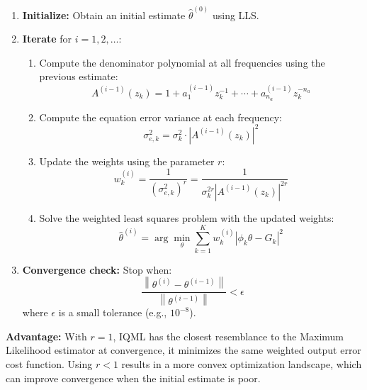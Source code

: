 \begin{enumerate}
    \item \textbf{Initialize:} Obtain an initial estimate $\hat{\theta}^{(0)}$ using LLS.
    
    \item \textbf{Iterate} for $i = 1, 2, \ldots$:
    \begin{enumerate}
        \item Compute the denominator polynomial at all frequencies using the previous estimate:
        \begin{equation}
            A^{(i-1)}(z_k) = 1 + a_1^{(i-1)} z_k^{-1} + \cdots + a_{n_a}^{(i-1)} z_k^{-n_a}
        \end{equation}
        
        \item Compute the equation error variance at each frequency:
        \begin{equation}
            \sigma_{e,k}^2 = \sigma_k^2 \cdot \left|A^{(i-1)}(z_k)\right|^2
        \end{equation}
        
        \item Update the weights using the parameter $r$:
        \begin{equation}
            w_k^{(i)} = \frac{1}{\left(\sigma_{e,k}^2\right)^r} = \frac{1}{\sigma_k^{2r} \left|A^{(i-1)}(z_k)\right|^{2r}}
        \end{equation}
        
        \item Solve the weighted least squares problem with the updated weights:
        \begin{equation}
            \hat{\theta}^{(i)} = \arg\min_\theta \sum_{k=1}^{K} w_k^{(i)} \left| \phi_k \theta - G_k \right|^2
        \end{equation}
    \end{enumerate}
    
    \item \textbf{Convergence check:} Stop when:
    \begin{equation}
        \frac{\left\|\theta^{(i)} - \theta^{(i-1)}\right\|}{\left\|\theta^{(i-1)}\right\|} < \epsilon
    \end{equation}
    where $\epsilon$ is a small tolerance (e.g., $10^{-8}$).
\end{enumerate}

\textbf{Advantage:} With $r=1$, IQML has the closest resemblance to the Maximum Likelihood estimator at convergence, it minimizes the same weighted output error cost function. Using $r < 1$ results in a more convex optimization landscape, which can improve convergence when the initial estimate is poor.

